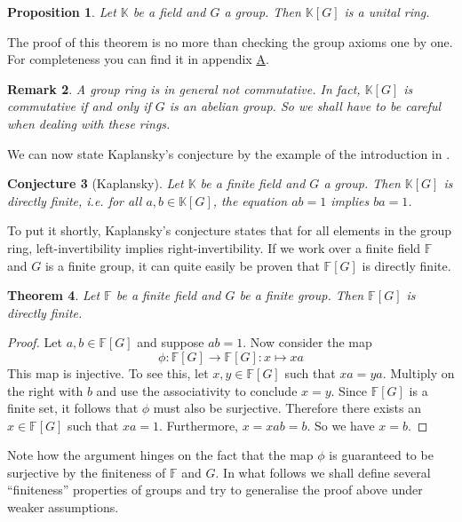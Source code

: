 \documentclass[titlepage, a4paper]{article}
\newcommand{\F}{\mathbb{F}}
\theoremstyle{theoremdd}
\newtheorem{theorem}{Theorem}[section]
\newtheorem{proposition}[theorem]{Proposition}
\newtheorem{conjecture}[theorem]{Conjecture}
\theoremstyle{definitiondd}
\theoremstyle{remarkdd}
\newtheorem{remark}[theorem]{Remark}
\begin{document}
\begin{proposition}
    Let $\mathbb K$ be a field and $G$ a group. Then $\mathbb K[G]$ is a unital ring.
\end{proposition}
The proof of this theorem is no more than checking the group axioms one by one. For completeness you can find it in appendix \hyperlink{sec:proof_groupring}{A}.

\begin{remark}
	A group ring is in general not commutative. In fact, $\mathbb{K}[G]$ is commutative if and only if $G$ is an abelian group. So we shall have to be careful when dealing with these rings. 
\end{remark}

We can now state Kaplansky's conjecture by the example of the introduction in \cite{elek_szabo_2003}.

\begin{conjecture}[Kaplansky]
	Let $\mathbb K$ be a finite field and $G$ a group. Then $\mathbb K[G]$ is directly finite, i.e. for all $a, b \in \mathbb K[G]$, the equation $ab=1$ implies $ba=1$.
\end{conjecture}

To put it shortly, Kaplansky's conjecture states that for all elements in the group ring, left-invertibility implies right-invertibility. If we work over a finite field $\F$ and $G$ is a finite group, it can quite easily be proven that $\F[G]$ is directly finite.

\begin{theorem}
    Let $\F$ be a finite field and $G$ be a finite group. Then $\F[G]$ is directly finite. 
\end{theorem}
\begin{proof}
    Let $a, b \in \mathbb F[G]$ and suppose $ab=1$. Now consider the map
    \[
        \phi: \mathbb F[G] \to \mathbb F[G]: x \mapsto x a
    \]
    This map is injective. To see this, let $x, y \in \mathbb F[G]$ such that $xa=ya$. Multiply on the right with $b$ and use the associativity to conclude $x=y$.
    Since $\mathbb F[G]$ is a finite set, it follows that $\phi$ must also be surjective. Therefore there exists an $x \in \mathbb F[G]$ such that $x a = 1$. Furthermore, $x = xab = b$. So we have $x = b$.
\end{proof}

Note how the argument hinges on the fact that the map $\phi$ is guaranteed to be surjective by the finiteness of $\mathbb F$ and $G$. In what follows we shall define several ``finiteness'' properties of groups and try to generalise the proof above under weaker assumptions.
\end{document}
